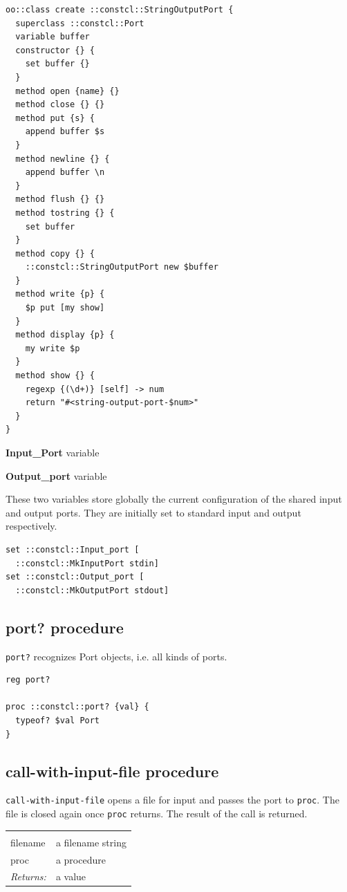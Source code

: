 \documentclass[twoside]{report}
\begin{document}
\begin{lstlisting}
oo::class create ::constcl::StringOutputPort {
  superclass ::constcl::Port
  variable buffer
  constructor {} {
    set buffer {}
  }
  method open {name} {}
  method close {} {}
  method put {s} {
    append buffer $s
  }
  method newline {} {
    append buffer \n
  }
  method flush {} {}
  method tostring {} {
    set buffer
  }
  method copy {} {
    ::constcl::StringOutputPort new $buffer
  }
  method write {p} {
    $p put [my show]
  }
  method display {p} {
    my write $p
  }
  method show {} {
    regexp {(\d+)} [self] -> num
    return "#<string-output-port-$num>"
  }
}
\end{lstlisting}

\textbf{Input\_Port} variable

\textbf{Output\_port} variable

These two variables store globally the current configuration of the shared input and output ports. They are initially set to standard input and output respectively.

\begin{lstlisting}
set ::constcl::Input_port [
  ::constcl::MkInputPort stdin]
set ::constcl::Output_port [
  ::constcl::MkOutputPort stdout]
\end{lstlisting}

\subsection{port? procedure}
\label{port-procedure}

\texttt{port?} recognizes Port objects, i.e. all kinds of ports.

\begin{lstlisting}
reg port?

proc ::constcl::port? {val} {
  typeof? $val Port
}
\end{lstlisting}

\subsection{call-with-input-file procedure}
\label{callwithinputfile-procedure}

\texttt{call-with-input-file} opens a file for input and passes the port to \texttt{proc}. The file is closed again once \texttt{proc} returns. The result of the call is returned.

\noindent\begin{tabular}{ |p{1.9cm} p{8cm}| }
\hline
\rowcolor[HTML]{CCCCCC} \multicolumn{2}{|l|}{\bf call-with-input-file (public)} \\
filename & a filename string \\
proc & a procedure \\
\textit{Returns:} & a value \\
\hline
\end{tabular}
\end{document}
